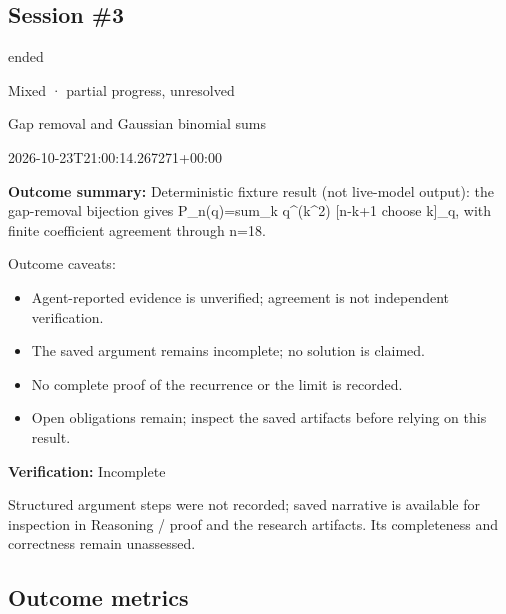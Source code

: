 \documentclass[11pt]{article}
\begin{document}
\subsection{Session \#3}
\begin{description}[style=nextline,font=\normalfont\bfseries,leftmargin=0pt,labelsep=0pt]
\item[Execution status] ended
\item[Outcome] Mixed · partial progress, unresolved
\item[Strategy] Gap removal and Gaussian binomial sums
\item[Started] 2026-10-23T21:00:14.267271+00:00
\end{description}
\textbf{Outcome summary:} Deterministic fixture result (not live-model output): the gap-removal bijection gives P\_n(q)=sum\_k q\textasciicircum{}(k\textasciicircum{}2) [n-k+1 choose k]\_q, with finite coefficient agreement through n=18.\par
Outcome caveats:\par
\begin{itemize}
\item Agent-reported evidence is unverified; agreement is not independent verification.
\item The saved argument remains incomplete; no solution is claimed.
\item No complete proof of the recurrence or the limit is recorded.
\item Open obligations remain; inspect the saved artifacts before relying on this result.
\end{itemize}
\textbf{Verification:} Incomplete\par
Structured argument steps were not recorded; saved narrative is available for inspection in Reasoning / proof and the research artifacts. Its completeness and correctness remain unassessed.\par
\subsection{Outcome metrics}
\end{document}
